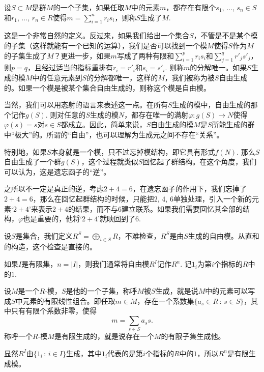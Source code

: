 \begin{para}
设$S\subset M$是群$M$的一个子集，如果任取$M$中的元素$m$，都存在有限个$s_1$, $\dots$, $s_n\in S$和$r_1$, $\dots$, $r_n\in R$使得$m=\sum_{i=1}^n r_is_i$，则称$S$生成了$M$.
\end{para}

这是一个非常自然的定义。反过来，如果我们给出一个集合$S$，不管是不是某个模的子集（这样就能有一个已知的运算），我们是否可以找到一个模$M$使得$S$作为$M$的子集生成了$M$？更进一步，如果$m$写成了两种有限和$\sum_{i=1}^p r_is_i$和$\sum_{j=1}^q r'_js'_j$，则$p=q$，且经过适当的指标重排有$r_i=r'_i$和$s_i=s'_i$. 则称$m$的分解唯一。如果$S$生成的模$M$中的任意元素到$S$的分解都唯一，这样的$M$，我们被称为被$S$自由生成的。如果一个模是被某个集合自由生成的，则称这个模是自由模。

当然，我们可以用态射的语言来表述这一点。在所有$S$生成的模中，自由生成的那个记作$g(S)$. 则对任意的$S$生成的模$N$，都存在唯一的满射$\varphi:g(S)\to N$使得$\varphi(s)=s$对$s\in S$都成立。因此，简单来说，$S$自由生成的模$M$是$S$所能生成的群中“极大”的。所谓的“自由”，也可以理解为生成元之间不存在“关系”。

特别地，如果$S$本身就是一个模，只不过忘掉模结构，即它具有形式$f(N)$. 那么$S$自由生成了一个群$g(S)$，这个过程就类似$S$回忆起了群结构。在这个角度，我们可以认为，这是遗忘函子的“逆”。

之所以不一定是真正的逆，考虑$2+4=6$，在遗忘函子的作用下，我们忘掉了$2+4=6$，那么在回忆起群结构的时候，只能把$2$, $4$, $6$单独处理，引入一个新的元素`$2+4$'来表示$2+4$的结果，而不与$6$建立联系。如果我们需要回忆其全部的结构，$\varphi$也是重要的，他将`$2+4$'就映回到了$6$.

\begin{para}[自由模的存在性]
设$S$是集合，我们定义$R^S=\bigoplus_{i\in S}R$，不难检查，$R^S$是由$S$生成的自由模。从直和的构造，这个检查是直接的。
\end{para}

如果$I$是有限集，$n=|I|$，则我们通常将自由模$R^I$记作$R^n$. 记$1_i$为第$i$个指标的$R$中的$1$.

\begin{para}
设$M$是一个$R$-模，$S$是他的一个子集，称呼$M$被$S$生成，就是说$M$中的元素可以写成$S$中元素的有限线性组合。即任取$m\in M$，存在一个系数集$\{a_s\in R\,:\, s\in S\}$，其中只有有限个系数非零，使得
\[
	m=\sum_{s\in S}a_s s.
\]
称呼一个$R$-模$M$是有限生成的，就是说存在一个$M$的有限子集生成他。
\end{para}

显然$R^I$由$\{1_i\,:\,i\in I\}$生成，其中$1_i$代表的是第$i$个指标的$R$中的$1$，所以$R^n$是有限生成模。

